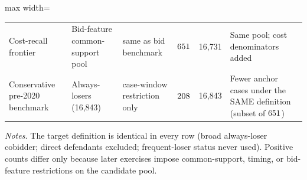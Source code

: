 \begin{table}[!htbp]
\begin{threeparttable}
\begin{adjustbox}{max width=\textwidth}
\begin{tabular}{p{3.4cm}p{3.2cm}p{2.8cm}rrp{4.2cm}}
Cost-recall frontier & Bid-feature common-support pool & same as bid benchmark & $651$ & 16,731 & Same pool; cost denominators added \\
Conservative pre-2020 benchmark & Always-losers (16,843) & case-window restriction only & $208$ & 16,843 & Fewer anchor cases under the SAME definition (subset of $651$) \\
\bottomrule
\end{tabular}
\end{adjustbox}
\begin{tablenotes}[flushleft]\scriptsize
\item \textit{Notes.} The target definition is identical in every
row (broad always-loser cobidder; direct defendants excluded;
frequent-loser status never used). Positive counts differ only
because later exercises impose common-support, timing, or
bid-feature restrictions on the candidate pool.
\end{tablenotes}
\end{threeparttable}
\end{table}

